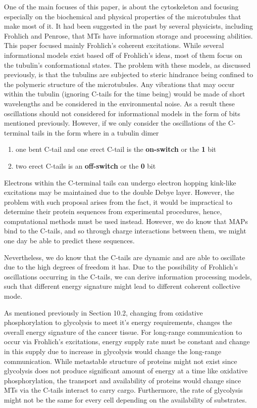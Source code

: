 \documentclass[letterpaper,final,times]{cas-dc}
\numberwithin{equation}{section}
\begin{document}
One of the main focuses of this paper, is about the cytoskeleton and focusing especially on the biochemical and physical properties of  the microtubules that make most of it. It had been suggested in the past by several physicists, including Frohlich and Penrose, that MTs have information storage and processing abilities. This paper focused mainly Frohlich’s coherent excitations. While several informational models exist based off of Frohlich’s ideas, most of them focus on the tubulin’s conformational states. The problem with these models, as discussed previously, is that the tubulins are subjected to steric hindrance being confined to the polymeric structure of the microtubules. Any vibrations that may occur within the tubulin (ignoring C-tails for the time being) would be made of short wavelengths and be considered in the environmental noise. As a result these oscillations should not considered for informational models in the form of bits mentioned previously. However, if we only consider the oscillations of the C-terminal tails in the form where in a tubulin dimer
\begin{enumerate}
    \item one bent C-tail and one erect C-tail is the \textbf{on-switch} or the \textbf{1} bit
    \item two erect C-tails is an \textbf{off-switch} or the \textbf{0} bit
\end{enumerate}

Electrons within the C-terminal tails can undergo electron hopping kink-like excitations may be maintained due to the double Debye layer. However, the problem with such proposal arises from the fact, it would be impractical to determine their protein sequences from experimental procedures, hence, computational methods must be used instead. However, we do know that MAPs bind to the C-tails, and so through charge interactions between them, we might one day be able to predict these sequences.

Nevertheless, we do know that the C-tails are dynamic and are able to oscillate due to the high degrees of freedom it has. Due to the possibility of Frohlich’s oscillations occurring in the C-tails, we can derive information processing models, such that different energy signature might lead to different coherent collective mode.

As mentioned previously in Section 10.2, changing from oxidative phosphorylation to glycolysis to meet it's energy requirements,  changes the overall energy signature of the cancer tissue. For long-range communication to occur via Frohlich’s excitations, energy supply rate must be constant and change in this supply due to increase in glycolysis would change the long-range communication. While metastable structure of proteins might not exist since glycolysis does not produce significant amount of energy at a time like oxidative phosphorylation, the transport and availability of proteins would change since MTs via the C-tails interact to carry cargo. Furthermore, the rate of glycolysis might not be the same for every cell depending on the availability of
substrates.
\end{document}
